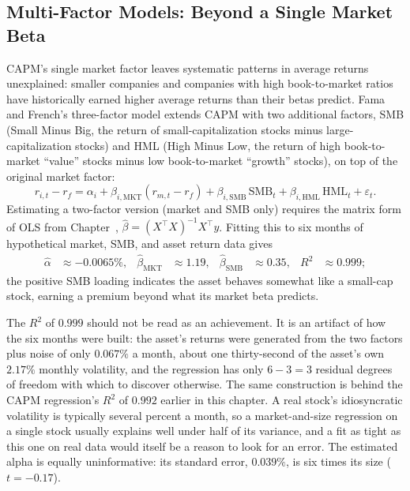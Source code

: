 \documentclass[../ai_in_finance]{subfiles}
\begin{document}
\subsection{Multi-Factor Models: Beyond a Single Market Beta}
\label{sec:factor-models}

CAPM's single market factor leaves systematic patterns in average returns unexplained: smaller companies and companies with high book-to-market ratios have historically earned higher average returns than their betas predict. Fama and French's three-factor model extends CAPM with two additional factors, SMB (Small Minus Big, the return of small-capitalization stocks minus large-capitalization stocks) and HML (High Minus Low, the return of high book-to-market ``value'' stocks minus low book-to-market ``growth'' stocks), on top of the original market factor:
\begin{equation}
r_{i,t} - r_f = \alpha_i + \beta_{i,\text{MKT}}(r_{m,t}-r_f) + \beta_{i,\text{SMB}}\,\text{SMB}_t + \beta_{i,\text{HML}}\,\text{HML}_t + \varepsilon_t.
\label{eq:portfolio-three-factor}
\end{equation}
Estimating a two-factor version (market and SMB only) requires the matrix form of OLS from Chapter~, $\hat\beta = (X^\top X)^{-1}X^\top y$. Fitting this to six months of hypothetical market, SMB, and asset return data gives
\begin{align*}
\hat\alpha &\approx -0.0065\%, & \hat\beta_{\text{MKT}} &\approx 1.19, & \hat\beta_{\text{SMB}} &\approx 0.35, & R^2 &\approx 0.999;
\end{align*}
the positive SMB loading indicates the asset behaves somewhat like a small-cap stock, earning a premium beyond what its market beta predicts.

The $R^2$ of $0.999$ should not be read as an achievement. It is an artifact of how the six months were built: the asset's returns were generated from the two factors plus noise of only $0.067\%$ a month, about one thirty-second of the asset's own $2.17\%$ monthly volatility, and the regression has only $6-3=3$ residual degrees of freedom with which to discover otherwise. The same construction is behind the CAPM regression's $R^2$ of $0.992$ earlier in this chapter. A real stock's idiosyncratic volatility is typically several percent a month, so a market-and-size regression on a single stock usually explains well under half of its variance, and a fit as tight as this one on real data would itself be a reason to look for an error. The estimated alpha is equally uninformative: its standard error, $0.039\%$, is six times its size ($t=-0.17$).
\end{document}
